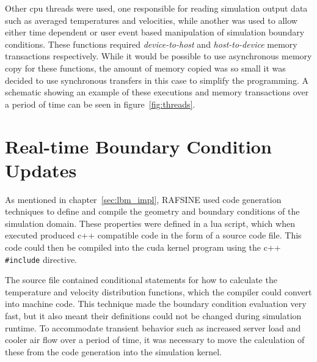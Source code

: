 Other \gls{cpu} threads were used, one responsible for reading simulation output data such as averaged temperatures and velocities, while another was used to allow either time dependent or user event based manipulation of simulation boundary conditions. These functions required \textit{device-to-host} and \textit{host-to-device} memory transactions respectively. While it would be possible to use asynchronous memory copy for these functions, the amount of memory copied was so small it was decided to use synchronous transfers in this case to simplify the programming. A schematic showing an example of these executions and memory transactions over a period of time can be seen in figure~\ref{fig:threads}.

\section{Real-time Boundary Condition Updates}\label{ch:real_time_bc}
As mentioned in chapter~\ref{sec:lbm_impl}, RAFSINE used code generation techniques to define and compile the geometry and boundary conditions of the simulation domain. These properties were defined in a \gls{lua} script, which when executed produced \gls{c++} compatible code in the form of a source code file. This code could then be compiled into the \gls{cuda} kernel program using the \gls{c++} \texttt{\#include} directive.

The source file contained conditional statements for how to calculate the temperature and velocity distribution functions, which the compiler could convert into machine code. This technique made the boundary condition evaluation very fast, but it also meant their definitions could not be changed during simulation runtime. To accommodate transient behavior such as increased server load and cooler air flow over a period of time, it was necessary to move the calculation of these from the code generation into the simulation kernel.

